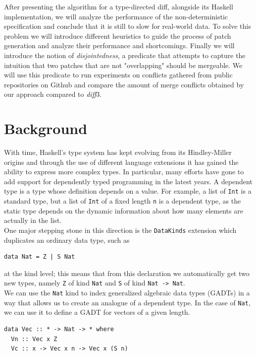 \documentclass[11pt, titlepage]{article}
\newcommand{\toHaskell}[1]{\texttt{#1}\xspace}
\newcommand{\diff}{\emph{diff}}
\begin{document}
After presenting the algorithm for a type-directed diff, alongside its Haskell implementation, we will analyze the performance of the non-deterministic specification and conclude that it is still to slow for real-world data. 
To solve this problem we will introduce different heuristics to guide the process of patch generation and analyze their performance and shortcomings.
Finally we will introduce the notion of \emph{disjointedness}, a predicate that attempts to capture the intuition that two patches that are not "overlapping" should be mergeable. We will use this predicate to run experiments on conflicts gathered from public repositories on Github and compare the amount of merge conflicts obtained by our approach compared to \diff3.

\section{Background}\label{dependent-types-in-haskell}

With time, Haskell's type system has kept evolving from its Hindley-Miller origins and through the use of different language extensions it has gained the ability to express more complex types. In particular, many efforts have gone to add support for dependently typed programming in the latest years. A dependent type is a type whose definition depends on a value. For example, a list of \toHaskell{Int} is a standard type, but a list of \toHaskell{Int} of a fixed length \toHaskell{n} is a dependent type, as the static type depends on the dynamic information about how many elements are actually in the list.
\\
One major stepping stone in this direction is the \toHaskell{DataKinds} \cite{datakinds} extension which duplicates an ordinary data type, such as

\begin{verbatim}
data Nat = Z | S Nat
\end{verbatim}

at the kind level; this means that from this declaration we automatically get two new types, namely \texttt{Z} of kind \texttt{Nat}
and \texttt{S} of kind \texttt{Nat -> Nat}.
\\
We can use the \texttt{Nat} kind to index generalized algebraic data types (GADTs) in a way that allows us to create an analogue of a dependent type. 
In the case of \texttt{Nat}, we can use it to define a GADT for vectors of a given length.
\\
\begin{verbatim}
data Vec :: * -> Nat -> * where
  Vn :: Vec x Z
  Vc :: x -> Vec x n -> Vec x (S n)
\end{verbatim}
\end{document}
